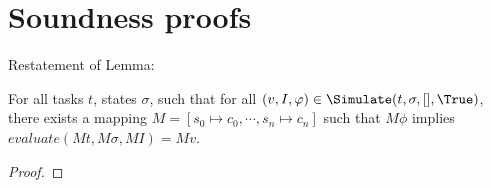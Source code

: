 
\section{Soundness proofs}
\label{sec:soundnessproofs}

Restatement of Lemma:\\

\begin{lemma}
  \label{lem:soundsimulate}

  For all tasks $t$, states $\sigma$,
  such that for all $(v,I,\phi)\in \Simulate (t,\sigma,[],\True)$,
  there exists a mapping $M = [s_0\mapsto c_0,\cdots,s_n\mapsto c_n]$
  such that $M\phi$ implies $evaluate (M t,M \sigma,M I) = M v$.
\end{lemma}

\begin{proof}
  
\end{proof}
